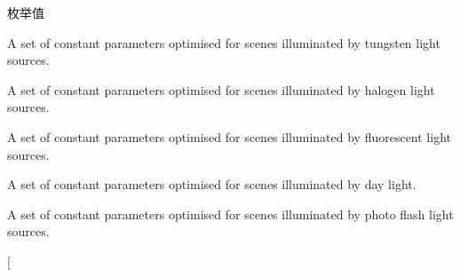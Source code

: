 \begin{Desc}
\item[枚举值]\par
\begin{description}
\item[{\em 
\hypertarget{group___common_interface_gga7559c75a4eb1303c10ba8b611022d4c7a42afb4c7aa733f93caf3f82b418835f2}{wbp\+Tungsten}\label{group___common_interface_gga7559c75a4eb1303c10ba8b611022d4c7a42afb4c7aa733f93caf3f82b418835f2}
}]A set of constant parameters optimised for scenes illuminated by tungsten light sources. \item[{\em 
\hypertarget{group___common_interface_gga7559c75a4eb1303c10ba8b611022d4c7aea8befcd0de5f8c0120447258e65c956}{wbp\+Halogen}\label{group___common_interface_gga7559c75a4eb1303c10ba8b611022d4c7aea8befcd0de5f8c0120447258e65c956}
}]A set of constant parameters optimised for scenes illuminated by halogen light sources. \item[{\em 
\hypertarget{group___common_interface_gga7559c75a4eb1303c10ba8b611022d4c7a0ba56a0101e955095e28817135e5a693}{wbp\+Fluorescent}\label{group___common_interface_gga7559c75a4eb1303c10ba8b611022d4c7a0ba56a0101e955095e28817135e5a693}
}]A set of constant parameters optimised for scenes illuminated by fluorescent light sources. \item[{\em 
\hypertarget{group___common_interface_gga7559c75a4eb1303c10ba8b611022d4c7a66c3193e7607d15cb084473405aa6ee1}{wbp\+Day\+Light}\label{group___common_interface_gga7559c75a4eb1303c10ba8b611022d4c7a66c3193e7607d15cb084473405aa6ee1}
}]A set of constant parameters optimised for scenes illuminated by day light. \item[{\em 
\hypertarget{group___common_interface_gga7559c75a4eb1303c10ba8b611022d4c7a0cb65e947c49fbf5f2a769bf63342eb9}{wbp\+Photo\+Flash}\label{group___common_interface_gga7559c75a4eb1303c10ba8b611022d4c7a0cb65e947c49fbf5f2a769bf63342eb9}
}]A set of constant parameters optimised for scenes illuminated by photo flash light sources. \item[{\em 
}
\end{description}
\end{Desc}
